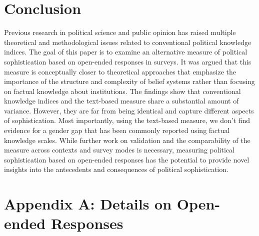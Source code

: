 \documentclass[12pt]{article}
\begin{document}
\section*{Conclusion}

Previous research in political science and public opinion has raised multiple theoretical and methodological issues related to conventional political knowledge indices. The goal of this paper is to examine an alternative measure of political sophistication based on open-ended responses in surveys. It was argued that this measure is conceptually closer to theoretical approaches that emphasize the importance of the structure and complexity of belief systems rather than focusing on factual knowledge about institutions. The findings show that conventional knowledge indices and the text-based measure share a substantial amount of variance. However, they are far from being identical and capture different aspects of sophistication. Most importantly, using the text-based measure, we don't find evidence for a gender gap that has been commonly reported using factual knowledge scales. While further work on validation and the comparability of the measure across contexts and survey modes is necessary, measuring political sophistication based on open-ended responses has the potential to provide novel insights into the antecedents and consequences of political sophistication.


\clearpage\singlespacing\footnotesize



\clearpage
\section*{Appendix A: Details on Open-ended Responses}
\renewcommand\thefigure{A.\arabic{figure}}
\renewcommand\thetable{A.\arabic{table}}
\setcounter{figure}{0}
\setcounter{table}{0}
\end{document}
